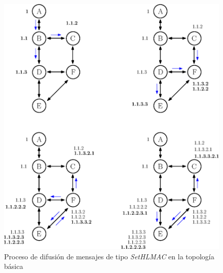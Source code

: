 \newpage
\begin{figure}[ht!]
    \centering
    \includegraphics[width=\textwidth]{archivos/img/dev/topo_sethlmac.eps}
    \caption{Proceso de difusión de mensajes de tipo \textit{SetHLMAC} en la topología básica}
    \label{fig:topo_sethlmac}
\end{figure}


